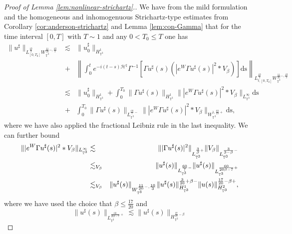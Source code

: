 \begin{proof}[Proof of Lemma \ref{lem:nonlinear-strichartz}.]
  We have from the mild formulation and the homogeneous and inhomogenuous
  Strichartz-type estimates from Corollary \ref{cor:anderson-strichartz} and
  Lemma \ref{lem:con-Gamma} that for the time interval $[0, T]$ with $T \sim
  1$ and any $0 < T_0 \leqslant T$ one has
  \begin{eqnarray*}
    \| u^{\sharp} \|_{L^{\frac{10}{3}}_{[0, T_0]}
    W_{\mathbb{T}^3}^{\frac{11}{20} -, \frac{10}{3}}} & \lesssim & \|
    u_0^{\sharp} \|_{H_{\mathbb{T}^3}^1}\\
    & + &\left\| \int^t_0 e^{- i (t - s)
    \mathcal{H}^{\sharp}} \Gamma^{- 1} [\Gamma u^{\sharp} (s) (| e^W \Gamma
    u^{\sharp} (s) |^2 \ast V_{\beta})] \mathrm{ds}
    \right\|_{L^{\frac{10}{3}}_{t ; [0, T_0]} W_{\mathbb{T}^3}^{\frac{11}{20}
    -, \frac{10}{3}}}\\
    & \lesssim & \| u_0^{\sharp} \|_{H_{\mathbb{T}^3}^1} + \int^{T_0}_0 \|
    \Gamma u^{\sharp} (s) \|_{H_{\mathbb{T}^3}^1} \| | e^W \Gamma u^{\sharp}
    (s) |^2 \ast V_{\beta} \|_{L_{\mathbb{T}^3}^{\infty}} \mathrm{ds}\\
    & + & \int^{T_0}_0 \| \Gamma u^{\sharp} (s) \|_{L^{\frac{60}{7}
    -}_{\mathbb{T}^3}} \| | e^W \Gamma u^{\sharp} (s) |^2 \ast V_{\beta}
    \|_{W_{\mathbb{T}^3}^{1, \frac{60}{23} +}} \mathrm{ds},
  \end{eqnarray*}
  where we have also applied the fractional Leibniz rule in the last
  inequality. We can further bound
  \begin{eqnarray*}
    \| | e^W \Gamma u^{\sharp} (s) |^2 \ast V_{\beta}
    \|_{L_{\mathbb{T}^3}^{\infty}} & \lesssim & \| | \Gamma u^{\sharp} (s) |^2
    \|_{L^{\frac{3}{\beta} +}_{\mathbb{T}^3}} \| V_{\beta}
    \|_{L_{\mathbb{T}^3}^{\frac{3}{3 - \beta} -}}\\
    & \lesssim_{V_{\beta}} & \| u^{\sharp} (s) \|_{L^{\frac{60}{7}
    -}_{\mathbb{T}^3}} \| u^{\sharp} (s) \|_{{L_{\mathbb{T}^3}^{\frac{60}{20
    \beta - 7} +}} }\\
    & \lesssim_{V_{\beta}} & \| u^{\sharp} (s)
    \|_{W_{\mathbb{T}^3}^{\frac{11}{20} -, \frac{10}{3}}} \| u^{\sharp} (s)
    \|^{\frac{3}{20} + \beta -}_{H_{\mathbb{T}^3}^1} \| u (s)
    \|^{{\color[HTML]{000000}\frac{17}{20} - \beta} +}_{H_{\mathbb{T}^3}^2},
  \end{eqnarray*}
  where we have used the choice that $\beta \leqslant \frac{17}{20}$ and
  \[ \| u^{\sharp} (s) \|_{{L_{\mathbb{T}^3}^{\frac{60}{20 \beta - 7} +}} }
     \lesssim \| u^{\sharp} (s) \|_{{H_{\mathbb{T}^3}^{\frac{37}{20} - \beta
}}}\]
\end{proof}
